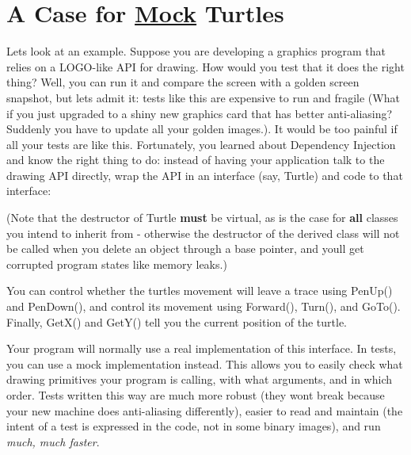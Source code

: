 \section*{A Case for \mbox{\hyperlink{class_mock}{Mock}} Turtles}

Let\textquotesingle{}s look at an example. Suppose you are developing a graphics program that relies on a L\+O\+G\+O-\/like A\+PI for drawing. How would you test that it does the right thing? Well, you can run it and compare the screen with a golden screen snapshot, but let\textquotesingle{}s admit it\+: tests like this are expensive to run and fragile (What if you just upgraded to a shiny new graphics card that has better anti-\/aliasing? Suddenly you have to update all your golden images.). It would be too painful if all your tests are like this. Fortunately, you learned about Dependency Injection and know the right thing to do\+: instead of having your application talk to the drawing A\+PI directly, wrap the A\+PI in an interface (say, {\ttfamily Turtle}) and code to that interface\+:


\begin{DoxyCode}{0}
\DoxyCodeLine{\};}
\end{DoxyCode}


(Note that the destructor of {\ttfamily Turtle} {\bfseries{must}} be virtual, as is the case for {\bfseries{all}} classes you intend to inherit from -\/ otherwise the destructor of the derived class will not be called when you delete an object through a base pointer, and you\textquotesingle{}ll get corrupted program states like memory leaks.)

You can control whether the turtle\textquotesingle{}s movement will leave a trace using {\ttfamily Pen\+Up()} and {\ttfamily Pen\+Down()}, and control its movement using {\ttfamily Forward()}, {\ttfamily Turn()}, and {\ttfamily Go\+To()}. Finally, {\ttfamily Get\+X()} and {\ttfamily Get\+Y()} tell you the current position of the turtle.

Your program will normally use a real implementation of this interface. In tests, you can use a mock implementation instead. This allows you to easily check what drawing primitives your program is calling, with what arguments, and in which order. Tests written this way are much more robust (they won\textquotesingle{}t break because your new machine does anti-\/aliasing differently), easier to read and maintain (the intent of a test is expressed in the code, not in some binary images), and run {\itshape much, much faster}.

